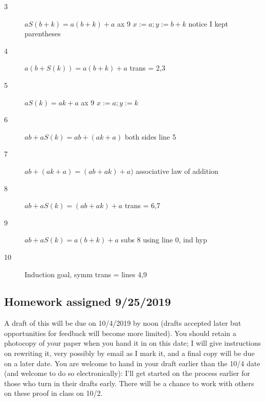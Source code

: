 \documentclass[12pt]{article}
\begin{document}
\begin{description}
\begin{description}
\begin{description}
\item[3]  $aS(b+k) = a(b+k)+a$  ax 9 $x:=a; y:=b+k$  notice I kept parentheses

\item[4]  $a(b+S(k)) = a(b+k)+a$ trans = 2,3

\item[5]  $aS(k) = ak+a$  ax 9 $x:=a; y:=k$

\item[6]  $ab+aS(k) = ab+(ak+a)$  both sides line 5

\item[7]  $ab+(ak+a) = (ab+ak)+a)$  associative law of addition

\item[8]  $ab+aS(k) = (ab+ak)+a$   trans = 6,7

\item[9]  $ab+aS(k) = a(b+k)+a$  subs 8 using line 0, ind hyp

\item[10]  Induction goal, symm trans = lines 4,9

\end{description}

\end{description}

\end{description}

\subsection{Homework assigned 9/25/2019}

A draft of this will be due on 10/4/2019 by noon (drafts accepted later but opportunities for feedback will become more limited).  You should retain a photocopy of your paper when you hand it in on this date; I will give instructions on rewriting it, very possibly by email as I mark it, and a final copy will be due on a later date.  You are welcome to hand in your draft earlier than the 10/4 date  (and welcome to do so electronically):  I'll get started on the process earlier for those who turn in their drafts early.  There will be a chance to work with others on these proof in class on 10/2.
\end{document}
